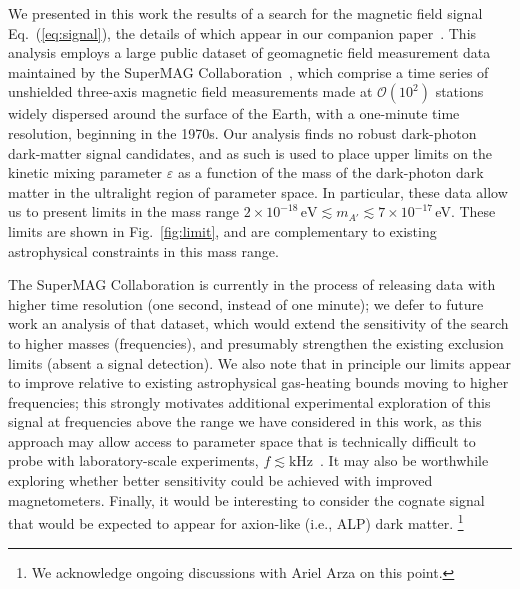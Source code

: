 \documentclass[amsmath,amssymb,aps,10pt,prd,letterpaper,nofootinbib,balancelastpage,notitlepage,superscriptaddress,twocolumn,floatfix]{revtex4-2}
\newcommand{\figref}[2][]{Fig{#1}.~\ref{#2}}		%
\renewcommand{\eqref}[2][]{Eq{#1}.~(\ref{eq:#2})}	%
\begin{document}
We presented in this work the results of a search for the magnetic field signal \eqref{signal}, the details of which appear in our companion paper~\cite{Fedderke:2021qva}.
This analysis employs a large public dataset of geomagnetic field measurement data maintained by the SuperMAG Collaboration~\cite{SuperMAGwebsite,Gjerloev:2009wsd,Gjerloev:2012sdg}, which comprise a time series of unshielded three-axis magnetic field measurements made at $\mathcal O(10^2)$ stations widely dispersed around the surface of the Earth, with a one-minute time resolution, beginning in the 1970s.
Our analysis finds no robust dark-photon dark-matter signal candidates, and as such is used to place upper limits on the kinetic mixing parameter $\varepsilon$ as a function of the mass of the dark-photon dark matter in the ultralight region of parameter space.
In particular, these data allow us to present limits in the mass range $2\times 10^{-18}\,\text{eV}\lesssim m_{A'} \lesssim 7\times 10^{-17}$\,eV.
These limits are shown in \figref{fig:limit}, and are complementary to existing astrophysical constraints in this mass range.

The SuperMAG Collaboration is currently in the process of releasing data with higher time resolution (one second, instead of one minute); we defer to future work an analysis of that dataset, which would extend the sensitivity of the search to higher masses (frequencies), and presumably strengthen the existing exclusion limits (absent a signal detection).
We also note that in principle our limits appear to improve relative to existing astrophysical gas-heating bounds moving to higher frequencies; this strongly motivates additional experimental exploration of this signal at frequencies above the range we have considered in this work, as this approach may allow access to parameter space that is technically difficult to probe with laboratory-scale experiments, $f \lesssim \text{kHz}$~\cite{Chaudhuri:2014dla}.
It may also be worthwhile exploring whether better sensitivity could be achieved with improved magnetometers.
Finally, it would be interesting to consider the cognate signal that would be expected to appear for axion-like (i.e., ALP) dark matter.%
\footnote{\label{ftnt:ArielArza}%
    We acknowledge ongoing discussions with Ariel Arza on this point.
} %


\acknowledgments
\end{document}
